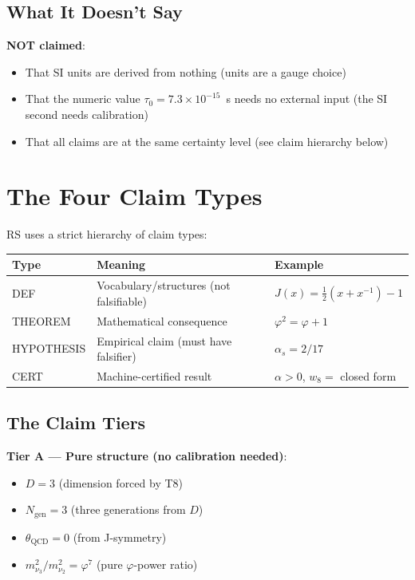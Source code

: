 \documentclass[12pt,a4paper]{article}
\theoremstyle{definition}
\theoremstyle{remark}
\begin{document}
\subsection{What It Doesn't Say}

\textbf{NOT claimed}:
\begin{itemize}
\item That SI units are derived from nothing (units are a gauge choice)
\item That the numeric value $\tau_0 = 7.3 \times 10^{-15}$~s needs no external input 
(the SI second needs calibration)
\item That all claims are at the same certainty level (see claim hierarchy below)
\end{itemize}

\section{The Four Claim Types}

RS uses a strict hierarchy of claim types:

\begin{center}
\begin{tabular}{lll}
\hline
Type & Meaning & Example \\
\hline
DEF & Vocabulary/structures (not falsifiable) & $J(x) = \frac{1}{2}(x+x^{-1})-1$ \\
THEOREM & Mathematical consequence & $\varphi^2 = \varphi + 1$ \\
HYPOTHESIS & Empirical claim (must have falsifier) & $\alpha_s = 2/17$ \\
CERT & Machine-certified result & $\alpha > 0$, $w_8 = $ closed form \\
\hline
\end{tabular}
\end{center}

\subsection{The Claim Tiers}

\textbf{Tier A — Pure structure (no calibration needed)}:
\begin{itemize}
\item $D = 3$ (dimension forced by T8)
\item $N_\mathrm{gen} = 3$ (three generations from $D$)
\item $\theta_\mathrm{QCD} = 0$ (from J-symmetry)
\item $m_{\nu_3}^2/m_{\nu_2}^2 = \varphi^7$ (pure $\varphi$-power ratio)
\end{itemize}
\end{document}
